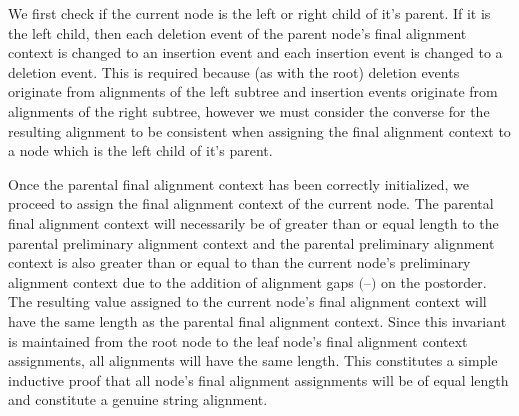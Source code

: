 \documentclass[11pt]{article}
\newcommand*\gap{\textrm{(--)}}
\begin{document}
We first check if the current node is the left or right child of it's parent.
If it is the left child, then each deletion event of the parent node's final alignment context is changed to an insertion event and each insertion event is changed to a deletion event.
This is required because (as with the root) deletion events originate from alignments of the left subtree and insertion events originate from alignments of the right subtree, however we must consider the converse for the resulting alignment to be consistent when assigning the final alignment context to a node which is the left child of it's parent.

Once the parental final alignment context has been correctly initialized, we proceed to assign the final alignment context of the current node.
The parental final alignment context will necessarily be of greater than or equal length to the parental preliminary alignment context and the parental preliminary alignment context is also greater than or equal to than the current node's preliminary alignment context due to the addition of alignment gaps $\gap$ on the postorder.
The resulting value assigned to the current node's final alignment context will have the same length as the parental final alignment context.
Since this invariant is maintained from the root node to the leaf node's final alignment context assignments, all alignments will have the same length.
This constitutes a simple inductive proof that all node's final alignment assignments will be of equal length and constitute a genuine string alignment.
\end{document}
